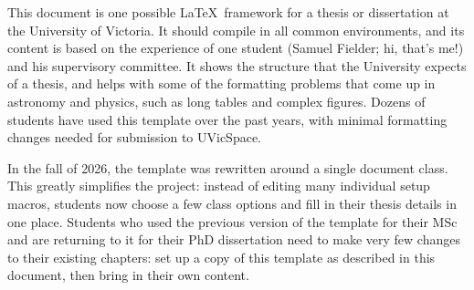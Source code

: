 
This document is one possible \LaTeX\ framework for a thesis or dissertation at the University of Victoria. It should compile in all common environments, and its content is based on the experience of one student (Samuel Fielder; hi, that's me!) and his supervisory committee. It shows the structure that the University expects of a thesis, and helps with some of the formatting problems that come up in astronomy and physics, such as long tables and complex figures. Dozens of students have used this template over the past years, with minimal formatting changes needed for submission to UVicSpace.

In the fall of 2026, the template was rewritten around a single document class. This greatly simplifies the project: instead of editing many individual setup macros, students now choose a few class options and fill in their thesis details in one place. Students who used the previous version of the template for their MSc and are returning to it for their PhD dissertation need to make very few changes to their existing chapters: set up a copy of this template as described in this document, then bring in their own content.
